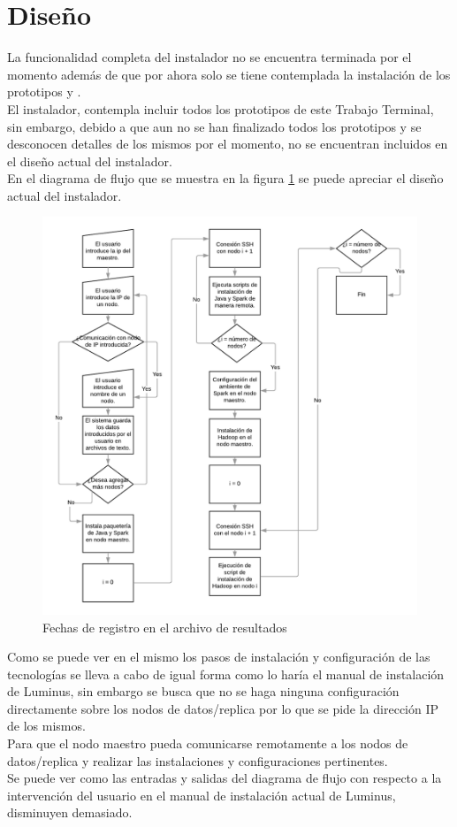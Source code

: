 \section{Diseño}
La funcionalidad completa del instalador no se encuentra terminada por el momento además de que por ahora solo se tiene contemplada la instalación de los prototipos  y . 
\\
El instalador, contempla incluir todos los prototipos de este Trabajo Terminal, sin embargo, debido a que aun no se han finalizado todos los prototipos y se desconocen detalles de los mismos por el momento, no se encuentran incluidos en el diseño actual del instalador.
\\
En el diagrama de flujo que se muestra en la figura \ref{fig:diagramaFlujo} se puede apreciar el diseño actual del instalador.
\begin{figure}[!htbp]
	\hypertarget{fig:diagramaFlujo}{\hspace{1pt}}
	\begin{center}
		\includegraphics[width=.9\textwidth]{capitulo5/images/diagramaFlujo.png}
		\caption{Fechas de registro en el archivo de resultados}
		\label{fig:diagramaFlujo}
	\end{center}
\end{figure}
\newpage
Como se puede ver en el mismo los pasos de instalación y configuración de las tecnologías se lleva a cabo de igual forma como lo haría el manual de instalación de Luminus, sin embargo se busca que no se haga ninguna configuración directamente sobre los nodos de datos/replica por lo que se pide la dirección IP de los mismos. 
\\
Para que el nodo maestro pueda comunicarse remotamente a los nodos de datos/replica y realizar las instalaciones y configuraciones pertinentes.
\\
Se puede ver como las entradas y salidas del diagrama de flujo con respecto a la intervención del usuario en el manual de instalación actual de Luminus, disminuyen demasiado.
